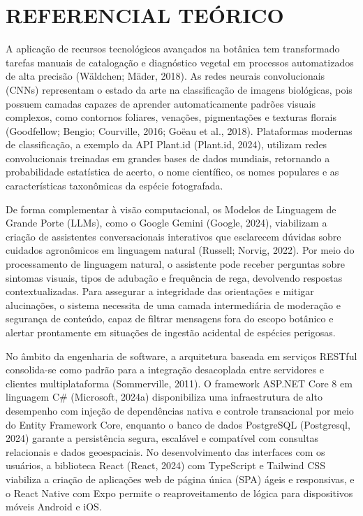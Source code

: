 \documentclass[12pt,a4paper]{article}
\begin{document}
\section{REFERENCIAL TEÓRICO}

A aplicação de recursos tecnológicos avançados na botânica tem transformado tarefas manuais de catalogação e diagnóstico vegetal em processos automatizados de alta precisão (Wäldchen; Mäder, 2018). As redes neurais convolucionais (CNNs) representam o estado da arte na classificação de imagens biológicas, pois possuem camadas capazes de aprender automaticamente padrões visuais complexos, como contornos foliares, venações, pigmentações e texturas florais (Goodfellow; Bengio; Courville, 2016; Goëau et al., 2018). Plataformas modernas de classificação, a exemplo da API Plant.id (Plant.id, 2024), utilizam redes convolucionais treinadas em grandes bases de dados mundiais, retornando a probabilidade estatística de acerto, o nome científico, os nomes populares e as características taxonômicas da espécie fotografada.

De forma complementar à visão computacional, os Modelos de Linguagem de Grande Porte (LLMs), como o Google Gemini (Google, 2024), viabilizam a criação de assistentes conversacionais interativos que esclarecem dúvidas sobre cuidados agronômicos em linguagem natural (Russell; Norvig, 2022). Por meio do processamento de linguagem natural, o assistente pode receber perguntas sobre sintomas visuais, tipos de adubação e frequência de rega, devolvendo respostas contextualizadas. Para assegurar a integridade das orientações e mitigar alucinações, o sistema necessita de uma camada intermediária de moderação e segurança de conteúdo, capaz de filtrar mensagens fora do escopo botânico e alertar prontamente em situações de ingestão acidental de espécies perigosas.

No âmbito da engenharia de software, a arquitetura baseada em serviços RESTful consolida-se como padrão para a integração desacoplada entre servidores e clientes multiplataforma (Sommerville, 2011). O framework ASP.NET Core 8 em linguagem C\# (Microsoft, 2024a) disponibiliza uma infraestrutura de alto desempenho com injeção de dependências nativa e controle transacional por meio do Entity Framework Core, enquanto o banco de dados PostgreSQL (Postgresql, 2024) garante a persistência segura, escalável e compatível com consultas relacionais e dados geoespaciais. No desenvolvimento das interfaces com os usuários, a biblioteca React (React, 2024) com TypeScript e Tailwind CSS viabiliza a criação de aplicações web de página única (SPA) ágeis e responsivas, e o React Native com Expo permite o reaproveitamento de lógica para dispositivos móveis Android e iOS.
\end{document}
